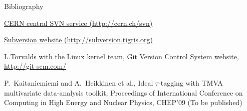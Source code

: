 \documentclass[final,hyperref={pdfpagelabels=false},notitlepage=true]{beamer}
\begin{document}
\begin{frame}{}
\begin{columns}[t]
\begin{column}{0.45\linewidth}
\begin{block}{\large Bibliography}
\begin{thebibliography}{9}
\href{http://cern.ch/svn}{CERN central SVN service (http://cern.ch/svn)}

\href{http://subversion.tigris.org}{Subversion website (http://subversion.tigris.org)}

L.Torvalds with the Linux kernel team,
Git Version Control System website,
\href{http://git-scm.com/}{http://git-scm.com/}


P.~Kaitaniemiemi and A.~Heikkinen et al.,
Ideal $\tau$-tagging with TMVA multivariate data-analysis toolkit,
Proceedings of International Conference on 
Computing in High Energy and Nuclear Physics, CHEP'09
(To be published)

\end{thebibliography}
\end{block}
    \vfill
    \end{column}
    \end{columns}
  \end{frame}
\end{document}
